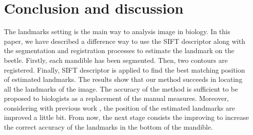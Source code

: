 \documentclass{gretsi}
\begin{document}
\section{Conclusion and discussion}
The landmarks setting is the main way to analysis image in biology. In this paper, we have described a difference way to use the SIFT descriptor along with the segmentation and registration processes to estimate the landmark on the beetle. Firstly, each mandible has been segmented. Then, two contours are registered. Finally, SIFT descriptor is applied to find the best matching position of estimated landmarks. The results show that our method succeeds in locating all the landmarks of the image. The accuracy of the method is sufficient to be proposed to biologists as a replacement of the manual measures. Moreover, considering with previous work \cite{leestimating}, the position of the estimated landmarks are improved a little bit. From now, the next stage consists the improving to increase the correct accuracy of the landmarks in the bottom of the mandible.



\end{document}
